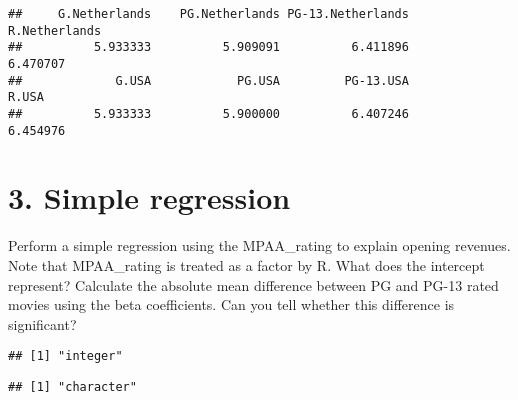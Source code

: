 \documentclass[
]{article}
\newenvironment{Shaded}{\begin{snugshade}}{\end{snugshade}}
\newcommand{\CommentTok}[1]{\textcolor[rgb]{0.56,0.35,0.01}{\textit{#1}}}
\newcommand{\KeywordTok}[1]{\textcolor[rgb]{0.13,0.29,0.53}{\textbf{#1}}}
\newcommand{\NormalTok}[1]{#1}
\newcommand{\OperatorTok}[1]{\textcolor[rgb]{0.81,0.36,0.00}{\textbf{#1}}}
\begin{document}
\begin{verbatim}
##     G.Netherlands    PG.Netherlands PG-13.Netherlands     R.Netherlands 
##          5.933333          5.909091          6.411896          6.470707 
##             G.USA            PG.USA         PG-13.USA             R.USA 
##          5.933333          5.900000          6.407246          6.454976
\end{verbatim}

\hypertarget{simple-regression}{%
\section{3. Simple regression}\label{simple-regression}}

Perform a simple regression using the MPAA\_rating to explain opening
revenues. Note that MPAA\_rating is treated as a factor by R. What does
the intercept represent? Calculate the absolute mean difference between
PG and PG-13 rated movies using the beta coefficients. Can you tell
whether this difference is significant?

\begin{Shaded}
\end{Shaded}

\begin{verbatim}
## [1] "integer"
\end{verbatim}

\begin{Shaded}
\end{Shaded}

\begin{verbatim}
## [1] "character"
\end{verbatim}

\begin{Shaded}
\end{Shaded}
\end{document}
